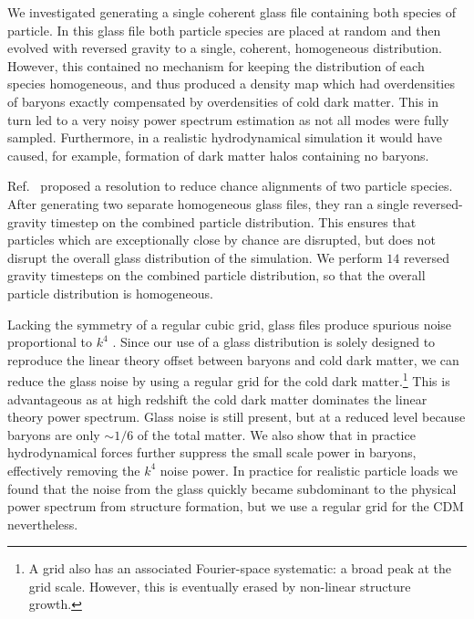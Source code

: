 \documentclass[a4paper,11pt]{article}
\newcommand{\YF}[1]{\textcolor{green}{[\bf YF: #1]} }
\begin{document}
We investigated generating a single coherent glass file containing both species of particle. In this glass file both particle species are placed at random and then evolved with reversed gravity to a single, coherent, homogeneous distribution. However, this contained no mechanism for keeping the distribution of each species homogeneous, and thus produced a density map which had overdensities of baryons exactly compensated by overdensities of cold dark matter. This in turn led to a very noisy power spectrum estimation as not all modes were fully sampled. Furthermore, in a realistic hydrodynamical simulation it would have caused, for example, formation of dark matter halos containing no baryons.

Ref.~\cite{Yoshida:2003} proposed a resolution to reduce chance alignments of two particle species. After generating two separate homogeneous glass files, they ran a single reversed-gravity timestep on the combined particle distribution. This ensures that particles which are exceptionally close by chance are disrupted, but does not disrupt the overall glass distribution of the simulation. We perform $14$ reversed gravity timesteps on the combined particle distribution, so that the overall particle distribution is homogeneous.

Lacking the symmetry of a regular cubic grid, glass files produce spurious noise proportional to $k^4$ \cite{Peebles:1993}. Since our use of a glass distribution is solely designed to reproduce the linear theory offset between baryons and cold dark matter, we can reduce the glass noise by using a regular grid for the cold dark matter.\footnote{A grid also has an associated Fourier-space systematic: a broad peak at the grid scale. However, this is eventually erased by non-linear structure growth.} This is advantageous as at high redshift the cold dark matter dominates the linear theory power spectrum. Glass noise is still present, but at a reduced level because baryons are only $\sim 1/6$ of the total matter. We also show that in practice hydrodynamical forces further suppress the small scale power in baryons, effectively removing the $k^4$ noise power. In practice for realistic particle loads we found that the noise from the glass quickly became subdominant to the physical power spectrum from structure formation, but we use a regular grid for the CDM nevertheless.

\end{document}
